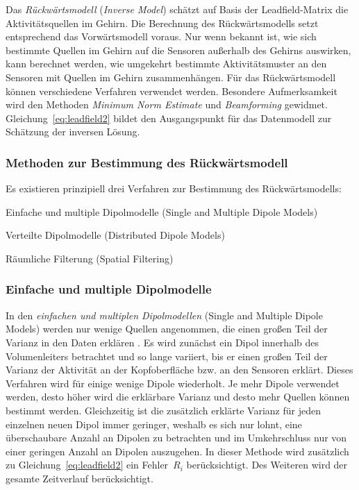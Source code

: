 \documentclass[doc,a4paper,12pt]{apa6}
\begin{document}
Das \emph{Rückwärtsmodell} (\emph{Inverse Model}) schätzt auf Basis der Leadfield-Matrix die Aktivitätsquellen im Gehirn. Die Berechnung des Rückwärtsmodells setzt entsprechend das Vorwärtsmodell voraus. Nur wenn bekannt ist, wie sich bestimmte Quellen im Gehirn auf die Sensoren außerhalb des Gehirns auswirken, kann berechnet werden, wie umgekehrt bestimmte Aktivitätsmuster an den Sensoren mit Quellen im Gehirn zusammenhängen. Für das Rückwärtsmodell können verschiedene Verfahren verwendet werden. Besondere Aufmerksamkeit wird den Methoden \emph{Minimum Norm Estimate} und \emph{Beamforming} gewidmet. Gleichung~\ref{eq:leadfield2} bildet den Ausgangspunkt für das Datenmodell zur Schätzung der inversen Lösung.

\subsubsection{Methoden zur Bestimmung des Rückwärtsmodell}

Es existieren prinzipiell drei Verfahren zur Bestimmung des Rückwärtsmodells:

\begin{compactitem}
\item Einfache und multiple Dipolmodelle (Single and Multiple Dipole Models)
\item Verteilte Dipolmodelle (Distributed Dipole Models)
\item Räumliche Filterung (Spatial Filtering)
\end{compactitem}

\subsubsection{Einfache und multiple Dipolmodelle}

In den \emph{ein\-fach\-en und mul\-ti\-plen Dipol\-mo\-del\-len} (Single and Multiple Dipole Models) werden nur wenige Quellen angenommen, die einen großen Teil der Varianz in den Daten erklären \parencite{scherg1990fundamentals}. Es wird zunächst ein Dipol innerhalb des Volumenleiters betrachtet und so lange variiert, bis er einen großen Teil der Varianz der Aktivität an der Kopfoberfläche bzw. an den Sensoren erklärt. Dieses Verfahren wird für einige wenige Dipole wiederholt. Je mehr Dipole verwendet werden, desto höher wird die erklärbare Varianz und desto mehr Quellen können bestimmt werden. Gleichzeitig ist die zusätzlich erklärte Varianz für jeden einzelnen neuen Dipol immer geringer, weshalb es sich nur lohnt, eine überschaubare Anzahl an Dipolen zu betrachten und im Umkehrschluss nur von einer geringen Anzahl an Dipolen auszugehen. In dieser Methode wird zusätzlich zu Gleichung~\ref{eq:leadfield2} ein Fehler~$R_i$ berücksichtigt. Des Weiteren wird der gesamte Zeitverlauf berücksichtigt.
\end{document}
